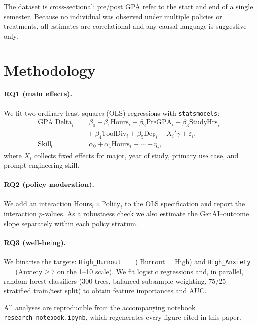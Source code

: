 \documentclass[11pt]{article}
\begin{document}
The dataset is cross-sectional: pre/post GPA refer to the start and end of a
single semester. Because no individual was observed under multiple policies
or treatments, all estimates are correlational and any causal language is
suggestive only.

\section{Methodology}
\label{sec:methods}

\paragraph{RQ1 (main effects).} We fit two ordinary-least-squares (OLS)
regressions with \texttt{statsmodels}:
\begin{align}
\text{GPA\_Delta}_i &= \beta_0 + \beta_1 \text{Hours}_i
  + \beta_2 \text{PreGPA}_i + \beta_3 \text{StudyHrs}_i \nonumber\\
&\quad + \beta_4 \text{ToolDiv}_i + \beta_5 \text{Dep}_i
  + X_i'\gamma + \varepsilon_i, \\
\text{Skill}_i &= \alpha_0 + \alpha_1 \text{Hours}_i + \cdots + \eta_i,
\end{align}
where $X_i$ collects fixed effects for major, year of study, primary use
case, and prompt-engineering skill.

\paragraph{RQ2 (policy moderation).} We add an interaction
$\text{Hours}_i \times \text{Policy}_i$ to the OLS specification and report
the interaction $p$-values. As a robustness check we also estimate the
GenAI--outcome slope separately within each policy stratum.

\paragraph{RQ3 (well-being).} We binarise the targets:
\texttt{High\_Burnout} $=$ ($\text{Burnout} = $ High) and
\texttt{High\_Anxiety} $=$ ($\text{Anxiety} \geq 7$ on the 1--10 scale). We
fit logistic regressions and, in parallel, random-forest classifiers
(300 trees, balanced subsample weighting, 75/25 stratified train/test split)
to obtain feature importances and AUC.

All analyses are reproducible from the accompanying notebook
\texttt{research\_notebook.ipynb}, which regenerates every figure cited in
this paper.
\end{document}
